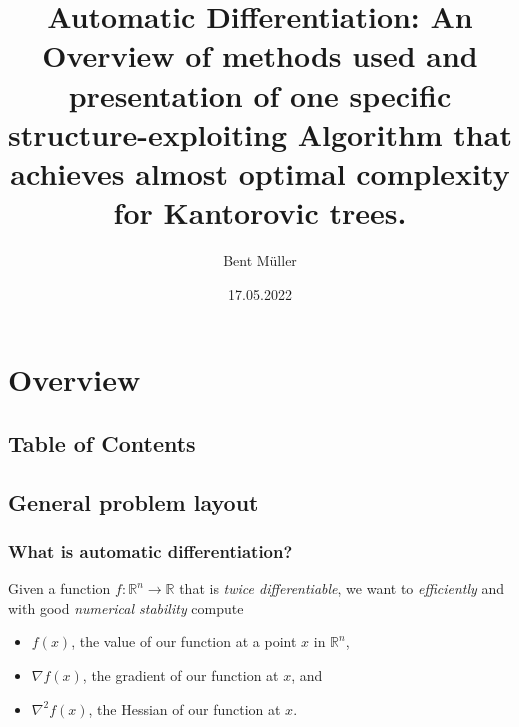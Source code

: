 \documentclass[compress]{beamer}
\title{
	Automatic Differentiation:
	An Overview of methods used and presentation of one
	specific structure-exploiting Algorithm that achieves
	almost optimal complexity for Kantorovic trees.
}
\author{Bent Müller}
\institute{University of Hamburg}
\date{17.05.2022}
\def\R{{\mathbb R}}
\begin{document}
\begin{frame}
	\titlepage
\end{frame}

\section{Overview}
\subsection{Table of Contents}
\begin{frame}
	\tableofcontents
\end{frame}

\subsection{General problem layout}

\begin{frame}
	\frametitle{What is automatic differentiation?}

	Given a function $f: \R^{n} \longrightarrow \R$ that is
	\textit{twice differentiable}, we want to
	\textit{efficiently}
	and with good \textit{numerical stability} compute
	\vspace{5mm}

	\begin{itemize}
		\item $f(x)$, the value of our function at a point $x$ in $\R^{n}$,
		\item $\nabla f(x)$, the gradient of our function at $x$, and
		\item $\nabla^2 f(x)$, the Hessian of our function at $x$.
	\end{itemize}
\end{frame}
\end{document}
